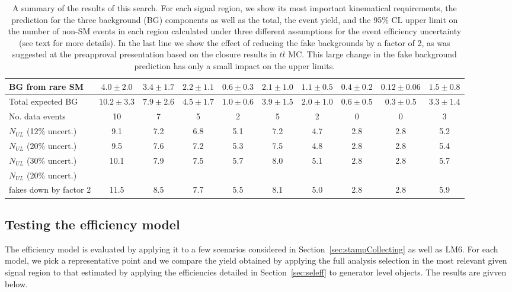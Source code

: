 \begin{sidewaystable}
\begin{tabular}{|l|c|c|c|c|c|c|c|c|c|}
BG from rare SM & $4.0 \pm 2.0$ & $3.4 \pm 1.7$ & $2.2 \pm 1.1$ & $0.6 \pm 0.3$ & $2.1 \pm 1.0$ & $1.1 \pm 0.5$ & $0.4 \pm 0.2$ & $0.12 \pm 0.06$ & $1.5 \pm 0.8$\\
\hline
Total expected BG  & $10.2 \pm 3.3$ & $7.9 \pm 2.6$ & $4.5 \pm 1.7$ & $1.0 \pm 0.6$ & $3.9 \pm 1.5$ & $2.0 \pm 1.0$ & $0.6 \pm 0.5$ & $0.3 \pm 0.5$ & $3.3 \pm 1.4$ \\
No. data events & 10 & 7 & 5 & 2 & 5 & 2 & 0 & 0 & 3 \\
\hline
$N_{UL}$ (12\% uncert.) & 9.1 & 7.2 & 6.8 & 5.1 & 7.2 & 4.7 & 2.8 & 2.8 & 5.2  \\
$N_{UL}$ (20\% uncert.) & 9.5 & 7.6 & 7.2 & 5.3 & 7.5 & 4.8 & 2.8 & 2.8 & 5.4 \\
$N_{UL}$ (30\% uncert.) & 10.1 & 7.9 & 7.5 & 5.7 & 8.0 & 5.1 & 2.8 & 2.8 & 5.7 \\ \hline \hline
$N_{UL}$ (20\% uncert.) & &     &     &     &     &     &     &   &  \\
fakes down by factor 2  & 11.5 & 8.5 & 7.7 & 5.5 & 8.1 & 5.0 & 2.8 & 2.8 & 5.9 \\
\hline
\end{tabular}
\caption{\label{tab:outreach} A summary of the results of this search.  For each signal region,
we show its most important kinematical requirements, the prediction for the three background 
(BG) components as well as the total, the event yield, and the 95\% CL upper 
limit on the number of non-SM events in each region calculated under three different 
assumptions for the event efficiency uncertainty (see text for more details).
In the last line we show the effect of reducing the fake backgrounds
by a factor of 2, as was suggested at the preapproval presentation based
on the closure results in $t\bar{t}$ MC.  This large change in the fake background
prediction has only a small impact on the upper limits.}
\end{sidewaystable}


\subsection{Testing the efficiency model}
\label{sec:outreachtest}


The efficiency model is evaluated by applying it to a few 
scenarios considered in Section~\ref{sec:stampCollecting} as
well as LM6.   
For each model, we pick a representative point
and we compare the
yield obtained by applying the full analysis selection 
in the most relevant given signal region 
to that estimated by applying the efficiencies detailed in 
Section~\ref{sec:seleff} to generator level objects.  
The results are givven below.

